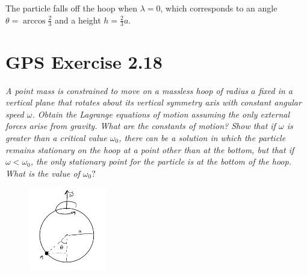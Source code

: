 \documentclass{article}
\begin{document}
The particle falls off the hoop when $\lambda = 0$, which corresponds to an angle $\theta = \arccos\frac{2}{3}$ and a height $h = \frac{2}{3} a$. 
\newpage


\section{GPS Exercise 2.18}
\textit{A point mass is constrained to move on a massless hoop of radius $a$ fixed in a vertical plane that rotates about its vertical symmetry axis with constant angular speed $\omega$. Obtain the Lagrange equations of motion assuming the only external forces arise from gravity. What are the constants of motion? Show that if $\omega$ is greater than a critical value $\omega_{0}$, there can be a solution in which the particle remains stationary on the hoop at a point other than at the bottom, but that if $\omega<\omega_{0}$, the only stationary point for the particle is at the bottom of the hoop. What is the value of $\omega_{0} ?$}

\begin{figure}[h!] 
    \centering
    \includegraphics[width=0.3\textwidth]{figures/problem_18.png}
    \label{fig:my_label}
\end{figure}
\end{document}
